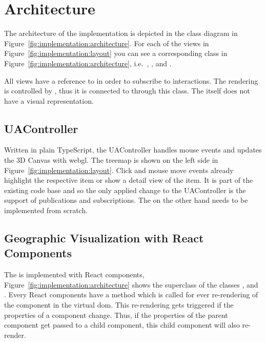 


\section{Architecture}
The architecture of the implementation is depicted in the class diagram in Figure~\ref{fig:implementation:architecture}.
For each of the views in Figure~\ref{fig:implementation:layout} you can see a corresponding class in Figure~\ref{fig:implementation:architecture}, i.e.\ , ,  and .

All views have a reference to  in order to subscribe to interactions.
The rendering \tmap{} is controlled by , thus it is connected to  through this class.
The  itself does not have a visual representation.

\subsection{UAController}
Written in plain TypeScript, the UAController handles mouse events and updates the 3D Canvas with \gls{webgl}.
The treemap is shown on the left side in Figure~\ref{fig:implementation:layout}.
Click and mouse move events already highlight the respective item or show a detail view of the item.
It is part of the existing code base and so the only applied change to the UAController is the support of publications and subscriptions.
The \gv{} on the other hand needs to be implemented from scratch.

\subsection{Geographic Visualization with React Components}
The \gv{} is implemented with React components, Figure~\ref{fig:implementation:architecture} shows the superclass  of the classes ,  and .
Every React components have a  method which is called for ever re-rendering of the component in the virtual \gls{dom}.
This re-rendering gets triggered if the properties of a component change.
Thus, if the properties of the parent component get passed to a child component, this child component will also re-render.

